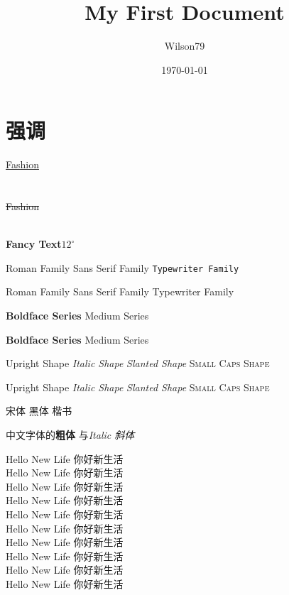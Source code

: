 \documentclass[10pt]{article} %
\title{\rmfamily My First Document}
\author{Wilson79}
\date{\today}
\newcommand{\myfont} {\textbf{\textsf{Fancy Text}}}
\newcommand{\degree} {^\circ}  %
\begin{document}
 
\section{强调}
	\begin{flushleft}

	\uline{Fashion}\\
	\\
	\\
	\sout{Fashion}\\
	\\

	\end{flushleft}


	{\myfont $ 12\degree$}

	\textrm{Roman Family} 
	\textsf{Sans Serif Family}
	\texttt{Typewriter Family}

	\rmfamily Roman Family
	\sffamily Sans Serif Family
	{\ttfamily Typewriter Family}

	\textbf{Boldface Series}
	\textmd{Medium Series}

	{\bfseries Boldface Series}
	{\mdseries Medium Series}

	
	
	\textup{Upright Shape} \textit{Italic Shape}
	\textsl{Slanted Shape} \textsc{Small Caps Shape}

	{\upshape Upright Shape} {\itshape Italic Shape} 
	{\slshape Slanted Shape} {\scshape Small Caps Shape}

	{\songti 宋体} {\heiti 黑体} 
	{\kaishu 楷书}

	中文字体的\textbf{粗体 }与\textit{Italic 斜体} 


	{\tiny Hello New Life 你好新生活} \\
	{\scriptsize Hello New Life 你好新生活} \\
	{\footnotesize Hello New Life 你好新生活} \\
	{\small Hello New Life 你好新生活} \\
	{\normalsize Hello New Life 你好新生活} \\
	{\large Hello New Life 你好新生活} \\
	{\Large Hello New Life 你好新生活} \\
	{\LARGE Hello New Life 你好新生活} \\
	{\huge Hello New Life 你好新生活} \\
	{\Huge Hello New Life 你好新生活} \\
\end{document}
